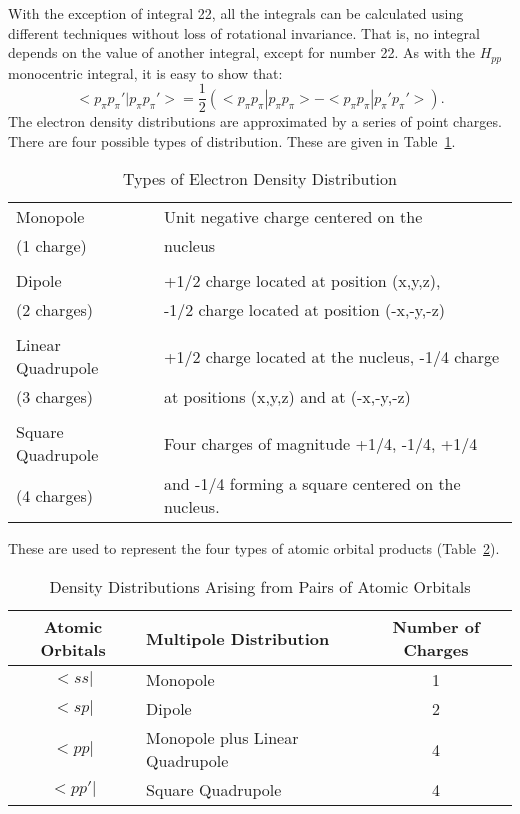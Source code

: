 \documentclass[a4paper]{book}
\begin{document}
 With the exception of integral 22, all the integrals can
be calculated using different techniques without loss of
rotational invariance. That is, no integral depends on the
value of another integral, except for number 22. As with
the $H_{pp}$ monocentric integral, it is easy to show that:
$$
 <p_{\pi} p_{\pi} '|p_{\pi} p_{\pi} '> = \frac{1}{2}(<p_{\pi} p_{\pi} |p_{\pi} p_{\pi} >
- <p_{\pi} p_{\pi} |p_{\pi} 'p_{\pi} '>).
$$
 The electron density distributions are approximated by a
series of point charges. There are four possible types of
distribution. These are given in Table~\ref{mp}.

\begin{table}
\caption{\label{mp}Types of Electron Density Distribution}
\begin{center}
\begin{tabular}{ll}\hline
 Monopole & Unit negative charge centered on the  \\
 (1 charge)&  nucleus  \\
\\
 Dipole & +1/2 charge located at position (x,y,z),  \\
 (2 charges) & -1/2 charge located at position (-x,-y,-z)  \\
\\
 Linear Quadrupole& +1/2 charge located at the nucleus, -1/4 charge  \\
 (3 charges) & at positions (x,y,z) and at (-x,-y,-z)  \\
\\
 Square Quadrupole& Four charges of magnitude +1/4, -1/4, +1/4  \\
 (4 charges) & and -1/4 forming a square centered on the  nucleus.  \\ \hline
\end{tabular}
\end{center}
\end{table}

These are used to represent the four types of atomic orbital
products (Table~\ref{prod}).

\begin{table}
\caption{\label{prod}Density Distributions Arising from Pairs of Atomic Orbitals}
\begin{center}
\begin{tabular}{clc}\hline
Atomic Orbitals &  Multipole Distribution & Number of Charges \rule[-0.2cm]{0cm}{0.6cm} \\ \hline
$ <ss| $  &  Monopole                      &  1  \\
$ <sp| $  &  Dipole                        &  2  \\
$ <pp| $  &  Monopole plus Linear Quadrupole &4  \\
$ <pp'|$  &  Square Quadrupole             &  4  \\ \hline
\end{tabular}
\end{center}
\end{table}
\end{document}
